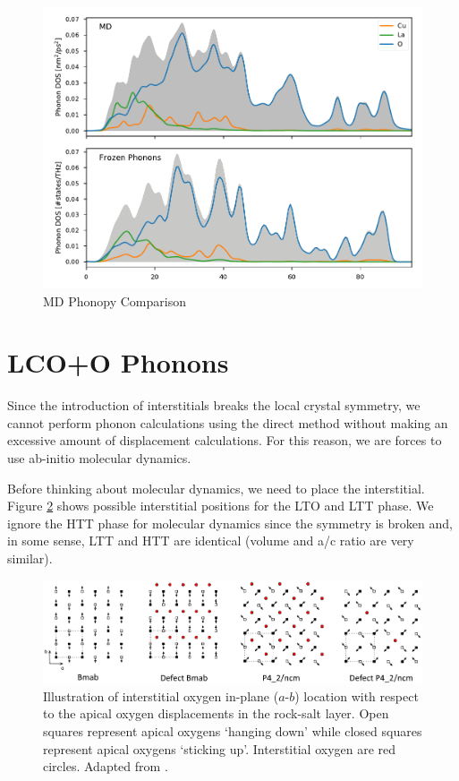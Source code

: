 \begin{figure}
	\centering
	\includegraphics[width=\textwidth]{fig/md/md_phonopy_comparison.pdf}
	\caption[MD Phonopy Comparison]{MD Phonopy Comparison}
	\label{fig:md_phonopy_comparison}
\end{figure}

\section{LCO+O Phonons}
Since the introduction of interstitials breaks the local crystal symmetry, we cannot perform phonon calculations using the direct method without making an excessive amount of displacement calculations. For this reason, we are forces to use ab-initio molecular dynamics.

Before thinking about molecular dynamics, we need to place the interstitial. Figure \ref{fig:oint_location} shows possible interstitial positions for the LTO and LTT phase. We ignore the HTT phase for molecular dynamics since the symmetry is broken and, in some sense, LTT and HTT are identical (volume and a/c ratio are very similar).

\begin{figure}
    \centering
    \includegraphics[width=\textwidth]{fig/md/oint.png}
    \caption[Illustration of interstitial positions]{Illustration of interstitial oxygen in-plane ($a$-$b$) location with respect to the apical oxygen displacements in the rock-salt layer. Open squares represent apical oxygens `hanging down' while closed squares represent apical oxygens `sticking up'. Interstitial oxygen are red circles. Adapted from \cite{Tranquada1995}.}
    \label{fig:oint_location}
\end{figure}

